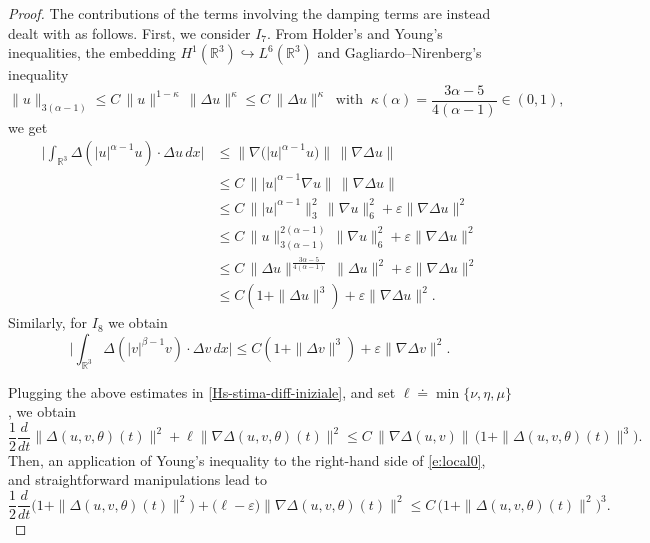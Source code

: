 \documentclass[a4paper]{article}
\newcommand{\dx}{\, dx}
\newcommand{\R}{\mathbb{R}}
\begin{document}
\begin{proof}
   The contributions of the terms involving the damping terms are instead dealt with as follows.
   First, we consider $I_7$. From Holder's and Young's inequalities, the embedding
   $H^1(\mathbb{R}^3)\hookrightarrow L^6(\mathbb{R}^3)$ and Gagliardo--Nirenberg\rq{}s inequality
  \begin{equation} \label{e:loc-est-alpha}
    \|u\|_{3(\alpha-1)}\le C\, \|u\|^{1-\kappa}\, \|\Delta u\|^{\kappa}\le C\,  \|\Delta u\|^{\kappa} \
    \mbox{ with } \ \kappa(\alpha)=\frac{3\alpha-5}{4(\alpha-1)} \in (0,1),
  \end{equation}
  we get
    \begin{align*}
      \Big| \int_{\R^3}\Delta(|u|^{\alpha-1}u)\cdot \Delta u \dx\Big|
      & \le \|\nabla \big(|u|^{\alpha-1}u\big)\|\, \|\nabla \Delta u\|
      \\
      &\le C\,\||u|^{\alpha-1}\nabla u\|\, \|\nabla \Delta u\|
      \\
      &\le C\, \||u|^{\alpha-1}\|_3^2\, \|\nabla u\|_6^2 + \varepsilon
      \|\nabla \Delta u\|^2
      \\
      &\le C\, \|u\|_{3(\alpha-1)}^{2(\alpha-1)}\, \|\nabla u\|_6^2 +
      \varepsilon \|\nabla \Delta u\|^2
      \\
      &\le C\, \|\Delta u\|^\frac{3\alpha-5}{4(\alpha-1)}\, \|\Delta
      u\|^2+ \varepsilon \|\nabla \Delta u\|^2
      \\
      &\le C(1+\|\Delta u\|^3) + \varepsilon \|\nabla \Delta u\|^2.
          \end{align*}
          Similarly, for $I_8$ we obtain
          \begin{equation*}
      \Big| \int_{\R^3}\Delta(|v|^{\beta-1}v)\cdot \Delta v\dx\Big|  
     \le C(1+\|\Delta v\|^3) + \varepsilon \|\nabla \Delta v\|^2.
     \end{equation*}

  Plugging the above estimates in \eqref{Hs-stima-diff-iniziale}, and
  set $\ell \doteq \min \{\nu, \eta, \mu\}$, we obtain
  \begin{equation} \label{e:local0}
    \frac{1}{2} \frac{d}{dt} \|\Delta  (u, v, \theta) (t) \|^2
    + \ell\|\nabla \Delta(u, v, \theta)(t)\|^2
    \leq C\,
    \|\nabla \Delta (u,v)\|\,\big(1 + \|\Delta (u, v, \theta) (t)
    \|^3 \big).
  \end{equation}
 Then, an application of Young's inequality to the right-hand
  side of \eqref{e:local0}, and straightforward manipulations lead to
  \begin{equation*} \label{e:local}
    \frac{1}{2} \frac{d}{dt}\big(1+ \|\Delta  (u, v, \theta) (t) \|^2\big)
    + \big(\ell-\varepsilon\big)\|\nabla \Delta(u, v, \theta)(t)\|^2
    \leq C\,\big(1 + \|\Delta (u, v, \theta) (t)
    \|^2 \big)^3.
  \end{equation*}
    

\end{proof}
\end{document}
